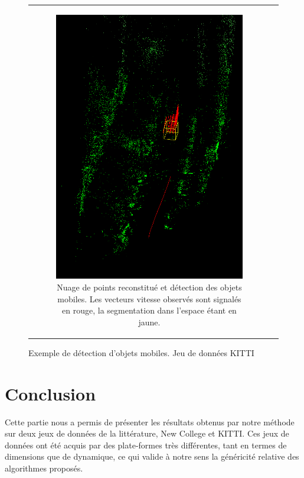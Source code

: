 \begin{figure}
{\begin{tabular}  {c c}
\begin{subfigure}{0.6\textwidth}
				\includegraphics[width=\textwidth]{Chapter6/graphics/screenshot7_crop.png} 
				\caption{Nuage de points reconstitué et détection des objets mobiles. Les vecteurs vitesse observés sont signalés en rouge, la segmentation dans l'espace étant en jaune.}
			\end{subfigure}
		\end{tabular}
	}
	\caption{Exemple de détection d'objets mobiles. Jeu de données \og KITTI\fg{} \cite{Geiger2012}}
	\label{fig:ch6_KITTI_move}
\end{figure}

\section{Conclusion}
Cette partie nous a permis de présenter les résultats obtenus par notre méthode sur deux jeux de données de la littérature, New College et KITTI. Ces jeux de données ont été acquis par des plate-formes très différentes, tant en termes de dimensions que de dynamique, ce qui valide à notre sens la généricité relative des algorithmes proposés.\\

